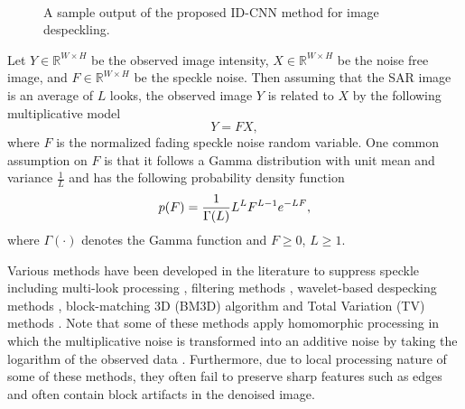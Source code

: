 \documentclass[journal]{IEEEtran}
\def\R{\mathbb R}
\begin{document}
\begin{figure}[t!]
	\centering
	\label{1a}\hspace{1em}
	\label{1b}\\
	
		\label{1a}\hspace{1em}
		\label{1b}
	\caption{A sample output of the proposed ID-CNN method for image despeckling.}
	\label{fig:sample_results} 
\end{figure}

Let $Y\in \R^{W\times H}$ be the observed image intensity, $X\in \R^{W\times H}$ be the noise free image, and $F\in \R^{W\times H}$ be the speckle noise.  Then assuming that the SAR image is an average of $L$ looks, the observed image $Y$ is related to $X$ by the following multiplicative model \cite{Book_Ulaby}
\begin{equation}\label{eq:multiplicative}
Y = F X,
\end{equation}
where $F$ is the normalized fading speckle noise random variable.  
One common assumption on $F$ is that it follows a Gamma distribution with unit mean and variance $\frac{1}{L}$ and has the following probability density function \cite{noisemodel}
\begin{align} \label{eq:pdf}
\centering
p(F) = \frac{1}{\Gamma(L)}L^LF^{L-1}e^{-LF},
\end{align}
where $\Gamma(\cdot)$ denotes the Gamma function and $F \geq 0$, $L \geq 1$.  



Various methods have been developed in the literature to suppress speckle  including multi-look processing \cite{Book_SAR_IMU, Thompson_SAR}, filtering methods \cite{lee1981speckle, frost, gammamap}, wavelet-based despecking methods \cite{DeSpeckle_wavelet_MRF, Despeckle_Wavelet_undecimeted, Despeckle_wavelet_heavytail, Despeckle_MCA}, block-matching 3D (BM3D) algorithm \cite{bm3d} and Total Variation (TV) methods \cite{Despeckle_TV}.   
Note that some of these methods apply homomorphic processing in which the multiplicative noise is transformed into an additive noise by taking the logarithm of the observed data \cite{Despeckle_MCA}.  Furthermore, due to local processing nature of some of these methods, they often fail to preserve sharp features such as edges and often contain block artifacts in the denoised image.  
\end{document}
